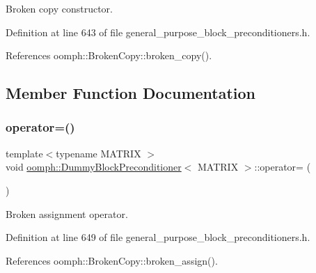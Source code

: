 Broken copy constructor. 



Definition at line 643 of file general\+\_\+purpose\+\_\+block\+\_\+preconditioners.\+h.



References oomph\+::\+Broken\+Copy\+::broken\+\_\+copy().



\subsection{Member Function Documentation}
\mbox{\label{classoomph_1_1DummyBlockPreconditioner_a199ba801e1e1ac6d294fd96fda009d03}} 
\subsubsection{\texorpdfstring{operator=()}{operator=()}}
{\footnotesize\ttfamily template$<$typename M\+A\+T\+R\+IX $>$ \\
void \hyperlink{classoomph_1_1DummyBlockPreconditioner}{oomph\+::\+Dummy\+Block\+Preconditioner}$<$ M\+A\+T\+R\+IX $>$\+::operator= (\begin{DoxyParamCaption}\item[{const \hyperlink{classoomph_1_1DummyBlockPreconditioner}{Dummy\+Block\+Preconditioner}$<$ M\+A\+T\+R\+IX $>$ \&}]{ }\end{DoxyParamCaption})\hspace{0.3cm}{\ttfamily [inline]}}



Broken assignment operator. 



Definition at line 649 of file general\+\_\+purpose\+\_\+block\+\_\+preconditioners.\+h.



References oomph\+::\+Broken\+Copy\+::broken\+\_\+assign().

\mbox{\label{classoomph_1_1DummyBlockPreconditioner_a362eae22ec757442bf17aa2de9bc82da}} 
